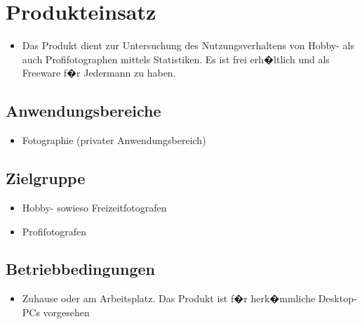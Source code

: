 \section{Produkteinsatz}
  \begin{itemize}
  \item Das Produkt dient zur Untersuchung des Nutzungsverhaltens von Hobby- als auch Profifotographen mittels Statistiken. Es ist frei erh�ltlich und als Freeware f�r Jedermann zu haben.
  \end{itemize}
\subsection{Anwendungsbereiche}
  \begin{itemize}
  \item Fotographie (privater Anwendungsbereich) 
  \end{itemize}

\subsection{Zielgruppe}
	\begin{itemize}
		\item Hobby- sowieso Freizeitfotografen
		\item Profifotografen		
	\end{itemize}

\subsection{Betriebbedingungen}
  \begin{itemize}
  		\item Zuhause oder am Arbeitsplatz. Das Produkt ist f�r herk�mmliche Desktop-PCs vorgesehen
  \end{itemize}
